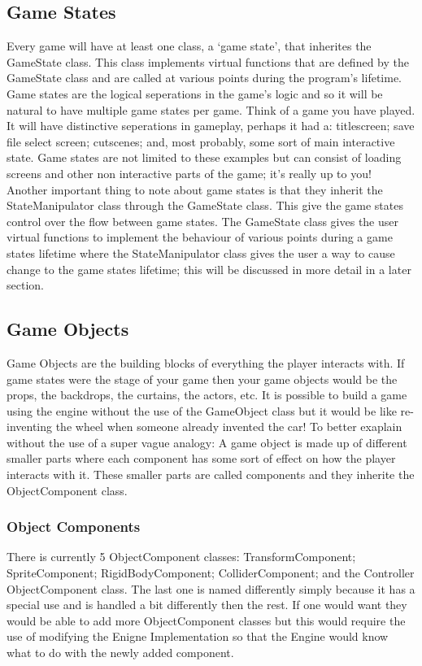 \documentclass[12pt]{article}
\begin{document}
\subsection{Game States}
Every game will have at least one class, a `game state', that inherites the GameState class.
This class implements virtual functions that are defined by the GameState class and are called at various points during the program's lifetime.
Game states are the logical seperations in the game's logic and so it will be natural to have multiple game states per game.
Think of a game you have played.
It will have distinctive seperations in gameplay, perhaps it had a: titlescreen; save file select screen; cutscenes; and, most probably, some sort of main interactive state.
Game states are not limited to these examples but can consist of loading screens and other non interactive parts of the game; it's really up to you!
\\

Another important thing to note about game states is that they inherit the StateManipulator class through the GameState class.
This give the game states control over the flow between game states.
The GameState class gives the user virtual functions to implement the behaviour of various points during a game states lifetime where the StateManipulator class gives the user a way to cause change to the game states lifetime; this will be discussed in more detail in a later section.
\subsection{Game Objects}
Game Objects are the building blocks of everything the player interacts with. If game states were the stage of your game then your game objects would be the props, the backdrops, the curtains, the actors, etc. It is possible to build a game using the engine without the use of the GameObject class but it would be like re-inventing the wheel when someone already invented the car! To better exaplain without the use of a super vague analogy: A game object is made up of different smaller parts where each component has some sort of effect on how the player interacts with it. These smaller parts are called components and they inherite the ObjectComponent class.

\subsubsection{Object Components}
There is currently 5 ObjectComponent classes: TransformComponent; SpriteComponent; RigidBodyComponent; ColliderComponent; and the Controller ObjectComponent class. The last one is named differently simply because it has a special use and is handled a bit differently then the rest. If one would want they would be able to add more ObjectComponent classes but this would require the use of modifying the Enigne Implementation so that the Engine would know what to do with the newly added component.
\\
\end{document}
